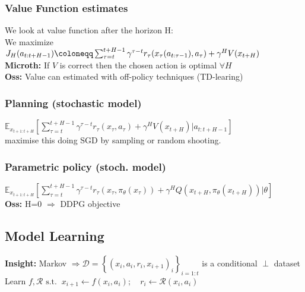 \subsubsection{Value Function estimates}
We look at value function after the horizon H: \\
We maximize $J_H(a_{t:t+H-1}) \coloneqq\\ \sum_{\tau = t}^{t+H-1}\gamma^{\tau - t}r_\tau(x_\tau (a_{t:\tau-1}), a_\tau) + \gamma^H V(x_{t+H})$\\
\textbf{Microth:} If $V$ is correct then the chosen action is optimal $\forall H$\\
\textbf{Oss:} Value can estimated with off-policy techniques (TD-learing)

\subsubsection{Planning (stochastic model)} \label{pl}
{\scriptsize $\mathbb{E}_{x_{t+1:t+H}}\left[ \sum\limits_{\tau = t}^{t+H-1}\gamma^{\tau - t}r_\tau(x_\tau, a_\tau) + \gamma^H V(x_{t+H})\vert a_{t:t+H-1}\right]$}\\
maximise this doing SGD by sampling or random shooting.

\subsubsection{Parametric policy (stoch. model)}
{\scriptsize $\mathbb{E}_{x_{t+1:t+H}}\left[ \sum\limits_{\tau = t}^{t+H-1}\gamma^{\tau - t}r_\tau(x_\tau, \pi_\theta(x_\tau)) + \gamma^H Q(x_{t+H}, \pi_\theta(x_{t+H}))\vert \theta\right]$}\\
\textbf{Oss:} H=0 $\Rightarrow$ DDPG objective

\subsection{Model Learning}
\textbf{Insight:} Markov $\Rightarrow \mathcal{D} = \left\{(x_i,a_i,r_i,x_{i+1})_i\right\}_{i=1:t}$ is a conditional $\perp$ dataset\\
Learn $f, \mathcal{R}\text{ s.t.} \;\; x_{i+1} \gets f(x_i,a_i);\quad r_i \gets \mathcal{R}(x_i,a_i)$ 

